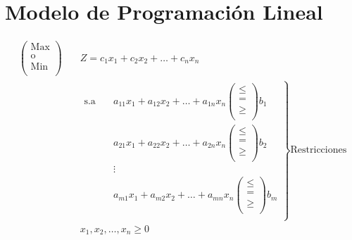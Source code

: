 \documentclass{templateNote}
\begin{document}
\section{Modelo de Programación Lineal}
\begin{equation*}
    \begin{aligned}
        \left(
            \begin{array}{ccc}
                \text{Max} \\
                \text{o} \\
                \text{Min} \\
            \end{array}
        \right) \quad & Z = c_1x_1 + c_2x_2 + \ldots + c_nx_n \\
        &\left.
            \begin{array}{llll}
                \text{s.a} \quad & a_{11}x_1 + a_{12}x_2 + \ldots + a_{1n}x_n \left(
                    \begin{array}{ccc}
                        \leq \\
                        = \\
                        \geq \\
                    \end{array}
                \right)  b_1 \\
                & a_{21}x_1 + a_{22}x_2 + \ldots + a_{2n}x_n \left(
                    \begin{array}{ccc}
                        \leq \\
                        = \\
                        \geq \\
                    \end{array}
                \right) b_2 \\
                & \vdots \\
                & a_{m1}x_1 + a_{m2}x_2 + \ldots + a_{mn}x_n \left(
                    \begin{array}{ccc}
                        \leq \\
                        = \\
                        \geq \\
                    \end{array}
                \right) b_m \\
            \end{array}
        \right\} \text{Restricciones} \\
        & x_1, x_2, \ldots, x_n \geq 0
    \end{aligned}
\end{equation*}    
\end{document}
